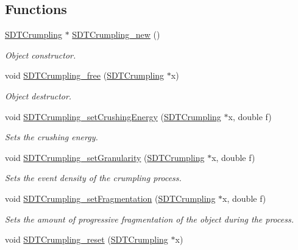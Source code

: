 \subsection*{Functions}
\begin{DoxyCompactItemize}
\item 
\hyperlink{group__crumpling_ga1d5c6cf3fe003cd4d993dcfe0a39f72e}{S\+D\+T\+Crumpling} $\ast$ \hyperlink{group__crumpling_ga5c4f19df719468828791ac6ee92fd3ee}{S\+D\+T\+Crumpling\+\_\+new} ()
\begin{DoxyCompactList}\small\item\em Object constructor. \end{DoxyCompactList}\item 
void \hyperlink{group__crumpling_ga5dbe175da229d809f2e92482a72ea1bb}{S\+D\+T\+Crumpling\+\_\+free} (\hyperlink{group__crumpling_ga1d5c6cf3fe003cd4d993dcfe0a39f72e}{S\+D\+T\+Crumpling} $\ast$x)
\begin{DoxyCompactList}\small\item\em Object destructor. \end{DoxyCompactList}\item 
void \hyperlink{group__crumpling_ga41986a18797f97a5f27554a702979c08}{S\+D\+T\+Crumpling\+\_\+set\+Crushing\+Energy} (\hyperlink{group__crumpling_ga1d5c6cf3fe003cd4d993dcfe0a39f72e}{S\+D\+T\+Crumpling} $\ast$x, double f)
\begin{DoxyCompactList}\small\item\em Sets the crushing energy. \end{DoxyCompactList}\item 
void \hyperlink{group__crumpling_ga813d36c8f3c981a70c2f2e24059da618}{S\+D\+T\+Crumpling\+\_\+set\+Granularity} (\hyperlink{group__crumpling_ga1d5c6cf3fe003cd4d993dcfe0a39f72e}{S\+D\+T\+Crumpling} $\ast$x, double f)
\begin{DoxyCompactList}\small\item\em Sets the event density of the crumpling process. \end{DoxyCompactList}\item 
void \hyperlink{group__crumpling_ga1be320d8744d98d47de5f9e0150d55a2}{S\+D\+T\+Crumpling\+\_\+set\+Fragmentation} (\hyperlink{group__crumpling_ga1d5c6cf3fe003cd4d993dcfe0a39f72e}{S\+D\+T\+Crumpling} $\ast$x, double f)
\begin{DoxyCompactList}\small\item\em Sets the amount of progressive fragmentation of the object during the process. \end{DoxyCompactList}\item 
\hypertarget{group__crumpling_ga7ac34fe60e07176b4da089f511e94648}{}void \hyperlink{group__crumpling_ga7ac34fe60e07176b4da089f511e94648}{S\+D\+T\+Crumpling\+\_\+reset} (\hyperlink{group__crumpling_ga1d5c6cf3fe003cd4d993dcfe0a39f72e}{S\+D\+T\+Crumpling} $\ast$x)\label{group__crumpling_ga7ac34fe60e07176b4da089f511e94648}


\end{DoxyCompactItemize}
